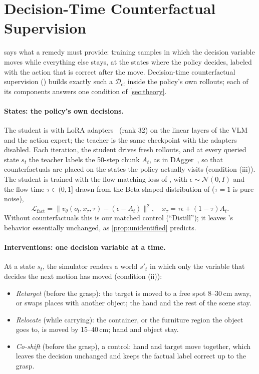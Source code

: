 \section{Decision-Time Counterfactual Supervision}
\label{sec:method}

 says what a remedy must provide: training samples in which the decision variable moves while
everything else stays, at the states where the policy decides, labeled with the action that is correct after the move.
Decision-time counterfactual supervision (\ours) builds exactly such a $\mathcal{D}_{\text{cf}}$ inside the policy's own
rollouts; each of its components answers one condition of \cref{sec:theory}.

\paragraph{States: the policy's own decisions.}
The student is \pizf with LoRA adapters~\cite{hu2022lora} (rank 32) on the linear layers of the VLM and the action expert;
the teacher is the same checkpoint with the adapters disabled.
Each iteration, the student drives fresh rollouts, and at every queried state $s_t$ the teacher labels the 50-step chunk
$A_t$, as in DAgger~\cite{ross2011dagger}, so that counterfactuals are placed on the states the policy actually visits
(condition (iii)).
The student is trained with the flow-matching loss of \pizf, with $\epsilon\sim\mathcal{N}(0,I)$ and the flow time
$\tau\in(0,1]$ drawn from the Beta-shaped distribution of \pizf ($\tau=1$ is pure noise),
\begin{equation}
\mathcal{L}_{\text{fact}} = \lVert v_\theta(o_t, x_\tau, \tau) - (\epsilon - A_t) \rVert^2,\quad x_\tau = \tau\epsilon + (1-\tau)A_t .
\end{equation}
Without counterfactuals this is our matched control (``Distill''); it leaves \pizf's behavior essentially unchanged, as
\cref{prop:unidentified} predicts.

\paragraph{Interventions: one decision variable at a time.}
At a state $s_t$, the simulator renders a world $s'_t$ in which only the variable that decides the next motion has moved
(condition (ii)):
\begin{itemize}
\item \emph{Retarget} (before the grasp): the target is moved to a free spot 8--30\,cm away, or swaps places with another
object; the hand and the rest of the scene stay.
\item \emph{Relocate} (while carrying): the container, or the furniture region the object goes to, is moved by 15--40\,cm;
hand and object stay.
\item \emph{Co-shift} (before the grasp), a control: hand and target move together, which leaves the decision unchanged and
keeps the factual label correct up to the grasp.
\end{itemize}

